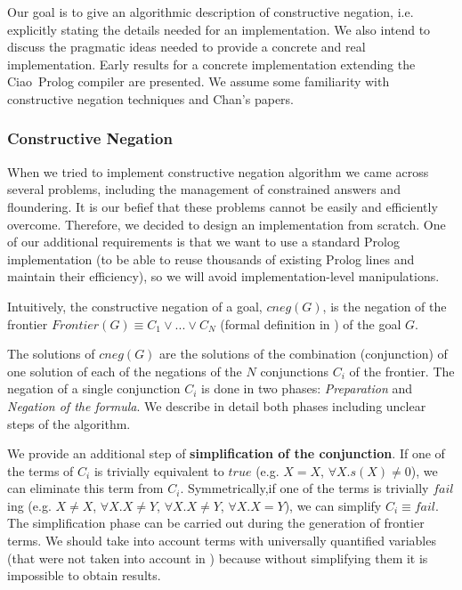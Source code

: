 \documentclass{llncs}
\newcommand{\ciao}{Ciao}
\begin{document}
Our goal is to give an algorithmic description of
constructive negation, i.e. explicitly stating the details needed for
an implementation. We also intend to discuss the pragmatic ideas
needed to provide a concrete and real implementation. Early results
for a concrete implementation extending the \ciao\ Prolog compiler are
presented.  We assume some familiarity with constructive negation
techniques and Chan's papers.


\subsubsection{Constructive Negation}
\label{constructive}

When we tried to implement constructive negation algorithm we came
across several problems, including the management of constrained
answers and floundering. It
is our befief that these problems cannot be easily and efficiently
overcome. Therefore, we decided to design an implementation from
scratch.  One of our additional requirements is that we want to use a
standard Prolog implementation (to be able to reuse thousands of
existing Prolog lines and maintain their efficiency), so we will avoid
implementation-level manipulations.

Intuitively, the constructive negation of a goal, $cneg(G)$, is the
negation of the frontier $Frontier(G) \equiv C_1 \vee ... \vee
C_N$ (formal definition in \cite{Stuckey95}) of the goal $G$.

The solutions of $cneg(G)$ are the solutions of the combination
(conjunction) of one solution of each of the negations of the $N$
conjunctions $C_i$ of the frontier.
The negation of a single conjunction $C_i$ is done in two phases:
\emph{Preparation} and \emph{Negation of the formula}. We describe in
detail both phases including unclear steps of the algorithm. 
 
We provide an additional step of {\bf simplification of the
conjunction}. If one of the terms of $C_i$ is trivially equivalent to
$true$ (e.g. $X=X$, $\forall X. s(X) \neq 0$), we can eliminate this
term from $C_i$. Symmetrically,if one of the terms is trivially
$fail$ing (e.g. $X \neq X$, $\forall X. X \neq Y$, $\forall X. X \neq
Y$, $\forall X. X = Y$), we can simplify $C_i \equiv fail$. The
simplification phase can be carried out during the generation of
frontier terms. We should take into account terms with universally
quantified variables (that were not taken into account in
\cite{Chan1,Chan2}) because without simplifying them it is impossible
to obtain results.
\end{document}
